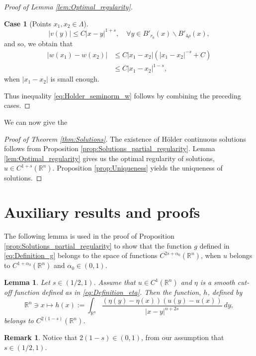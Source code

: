 \documentclass[11pt,reqno]{amsart}
\newtheorem{lem}[thm]{Lemma}
\theoremstyle{definition}
\newtheorem{case}{Case}
\newtheorem{rmk}[thm]{Remark}
\theoremstyle{remark}
\begin{document}
\begin{proof}[Proof of Lemma \ref{lem:Optimal_regularity}]
\begin{case}[Points $x_1,x_2\in\Lambda$]
$$
|v(y)| \leq C|x-y|^{1+s},\quad\forall y \in B'_{r_0}(x)\backslash B'_{4\rho}(x),
$$
and so, we obtain that 
\begin{align*}
|w(x_1)-w(x_2)| &\leq C|x_1-x_2|(|x_1-x_2|^{-s}+C)\\
&\leq C|x_1-x_2|^{1-s},
\end{align*}
when $|x_1-x_2|$ is small enough.
\end{case}
Thus inequality \eqref{eq:Holder_seminorm_w} follows by combining the preceding cases.
\end{proof}

We can now give the
\begin{proof}[Proof of Theorem \ref{thm:Solutions}]
The existence of H\"older continuous solutions follows from Proposition \ref{prop:Solutions_partial_regularity}. Lemma \ref{lem:Optimal_regularity} gives us the optimal regularity of solutions, $u\in C^{1+s}({\mathbb{R}}^n)$. Proposition \ref{prop:Uniqueness} yields the uniqueness of solutions.
\end{proof}

\appendix
\section{Auxiliary results and proofs}
\label{sec:Auxiliary_results_proofs}

The following lemma is used in the proof of Proposition \ref{prop:Solutions_partial_regularity} to show that the function $g$ defined in \eqref{eq:Definition_g} belongs to the space of functions $C^{2s+\alpha_0}({\mathbb{R}}^n)$, when $u$ belongs to $C^{1+\alpha_0}({\mathbb{R}}^n)$ and $\alpha_0\in (0,1)$.

\begin{lem}
\label{lem:Regularity_g}
Let $s\in(1/2,1)$. Assume that $u\in C^1({\mathbb{R}}^n)$ and $\eta$ is a smooth cut-off function defined as in \eqref{eq:Definition_eta}. Then the function, $h$, defined by
$$
{\mathbb{R}}^n \ni x \mapsto h(x):=\int_{{\mathbb{R}}^n} \frac{(\eta(y)-\eta(x))(u(y)-u(x))}{|x-y|^{n+2s}}\ dy,
$$
belongs to $C^{2(1-s)}({\mathbb{R}}^n)$.
\end{lem}

\begin{rmk}
Notice that $2(1-s)\in (0,1)$, from our assumption that $s\in (1/2,1)$.
\end{rmk}
\end{document}

